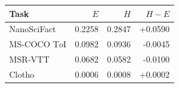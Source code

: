 \begin{tabular}{@{}lrrr@{}}
\toprule
Task & $E$ & $H$ & $H-E$ \\
\midrule
NanoSciFact & 0.2258 & 0.2847 & +0.0590 \\
MS-COCO T$	o$I & 0.0982 & 0.0936 & -0.0045 \\
MSR-VTT & 0.0682 & 0.0582 & -0.0100 \\
Clotho & 0.0006 & 0.0008 & +0.0002 \\
\bottomrule
\end{tabular}
